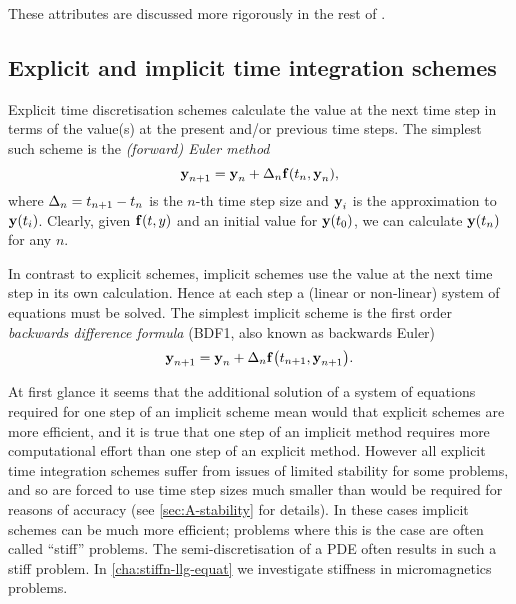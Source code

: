 These attributes are discussed more rigorously in the rest of .

\subsection{Explicit and implicit time integration schemes}
\label{sec:explicit-vs-implicit-schemes}

Explicit time discretisation schemes calculate the value at the next time step in terms of the value(s) at the present and/or previous time steps.
The simplest such scheme is the \emph{(forward) Euler method}
\begin{equation}
  \label{eq:44}
  \boldsymbol{\mathrm{y}}_{n+1} = \boldsymbol{\mathrm{y}}_n + \Delta_{n} {\boldsymbol{\mathrm{f}}}(t_n, \boldsymbol{\mathrm{y}}_n),
\end{equation}
where $\Delta_{n} = t_{n+1} - t_n$ is the $n$-th time step size and $\boldsymbol{\mathrm{y}}_i$ is the approximation to $\boldsymbol{\mathrm{y}}(t_i)$.
Clearly, given ${\boldsymbol{\mathrm{f}}}(t,y)$ and an initial value for $\boldsymbol{\mathrm{y}}(t_0)$, we can calculate $\boldsymbol{\mathrm{y}}(t_n)$ for any $n$.

In contrast to explicit schemes, implicit schemes use the value at the next time step in its own calculation.
Hence at each step a (linear or non-linear) system of equations must be solved.
The simplest implicit scheme is the first order \emph{backwards difference formula} (BDF1, also known as backwards Euler)
\begin{equation}
  \label{eq:bdf1-definition}
  \boldsymbol{\mathrm{y}}_{n+1} = \boldsymbol{\mathrm{y}}_n + \Delta_{n} {\boldsymbol{\mathrm{f}}{\left( t_{n+1}, \boldsymbol{\mathrm{y}}_{n+1} \right)}}.
\end{equation}

At first glance it seems that the additional solution of a system of equations required for one step of an implicit scheme mean would that explicit schemes are more efficient, and it is true that one step of an implicit method requires more computational effort than one step of an explicit method.
However all explicit time integration schemes suffer from issues of limited stability for some problems, and so are forced to use time step sizes much smaller than would be required for reasons of accuracy (see \cref{sec:A-stability} for details).
In these cases implicit schemes can be much more efficient; problems where this is the case are often called ``stiff'' problems.
The semi-discretisation of a PDE often results in such a stiff problem.
In \cref{cha:stiffn-llg-equat} we investigate stiffness in micromagnetics problems.




